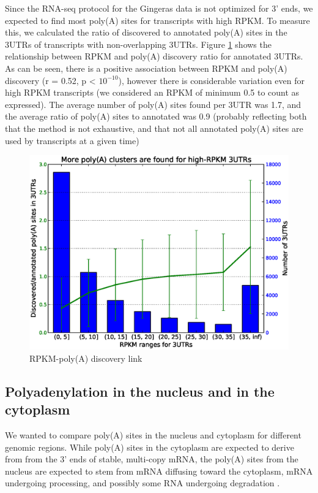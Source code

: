 \documentclass[a4paper]{article}
\begin{document}
Since the RNA-seq protocol for the Gingeras data is not optimized for 3' ends,
we expected to find most poly(A) sites for transcripts with high RPKM. To
measure this, we calculated the ratio of discovered to annotated poly(A) sites
in the 3UTRs of transcripts with non-overlapping 3UTRs. Figure \ref{fig:RPKM}
shows the relationship between RPKM and poly(A) discovery ratio for annotated
3UTRs. As can be seen, there is a positive association between RPKM and
poly(A) discovery (r = 0.52, p < $10^{-10}$), however there is considerable
variation even for high RPKM transcripts (we considered an RPKM of minimum 0.5
to count as expressed). The average number of poly(A) sites found per 3UTR was
1.7, and the average ratio of poly(A) sites to annotated was 0.9 (probably
reflecting both that the method is not exhaustive, and that not all annotated
poly(A) sites are used by transcripts at a given time)
\begin{figure}[h]
	\centering
		\includegraphics[scale=0.5]{../Figures/More_polyA_clusters_for_high_RPKM_3UTRS.eps}
	\caption{RPKM-poly(A) discovery link}
	\label{fig:RPKM}
\end{figure}
\subsection{Polyadenylation in the nucleus and in the cytoplasm}

We wanted to compare poly(A) sites in the nucleus and cytoplasm for different
genomic regions. While poly(A) sites in the cytoplasm are expected to derive
from from the 3' ends of stable, multi-copy mRNA, the poly(A) sites from the
nucleus are expected to stem from mRNA diffusing toward the cytoplasm, mRNA
undergoing processing, and possibly some RNA undergoing degradation
\cite{shcherbik_polyadenylation_2010,slomovic_addition_2010}.
\end{document}
